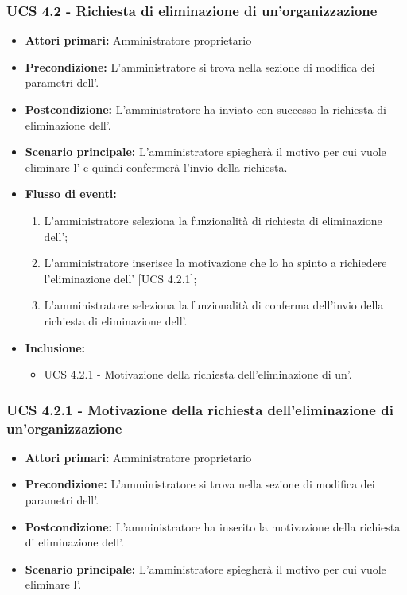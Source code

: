 \subsubsection{UCS 4.2 - Richiesta di eliminazione di un'organizzazione}%
\begin{itemize}
	\item \textbf{Attori primari:} Amministratore proprietario
	\item \textbf{Precondizione:} L'amministratore si trova nella sezione di modifica dei parametri dell'.
	\item \textbf{Postcondizione:} L'amministratore ha inviato con successo la richiesta di eliminazione dell'.
	\item \textbf{Scenario principale:} L'amministratore spiegherà il motivo per cui vuole eliminare l' e quindi confermerà l'invio della richiesta.
	\item \textbf{Flusso di eventi:}
	\begin{enumerate}
		\item L'amministratore seleziona la funzionalità di richiesta di eliminazione dell';
		\item L'amministratore inserisce la motivazione che lo ha spinto a richiedere l'eliminazione dell' [UCS 4.2.1];
		\item L'amministratore seleziona la funzionalità di conferma dell'invio della richiesta di eliminazione dell'.
	\end{enumerate}
\item \textbf{Inclusione:}
	\begin{itemize}
		\item UCS 4.2.1 - Motivazione della richiesta dell'eliminazione di un'.
	\end{itemize}
\end{itemize}

\subsubsection{UCS 4.2.1 - Motivazione della richiesta dell'eliminazione di un'organizzazione}%
\begin{itemize}
	\item \textbf{Attori primari:} Amministratore proprietario
	\item \textbf{Precondizione:} L'amministratore si trova nella sezione di modifica dei parametri dell'.
	\item \textbf{Postcondizione:} L'amministratore ha inserito la motivazione della richiesta di eliminazione dell'.
	\item \textbf{Scenario principale:} L'amministratore spiegherà il motivo per cui vuole eliminare l'.
\end{itemize}

